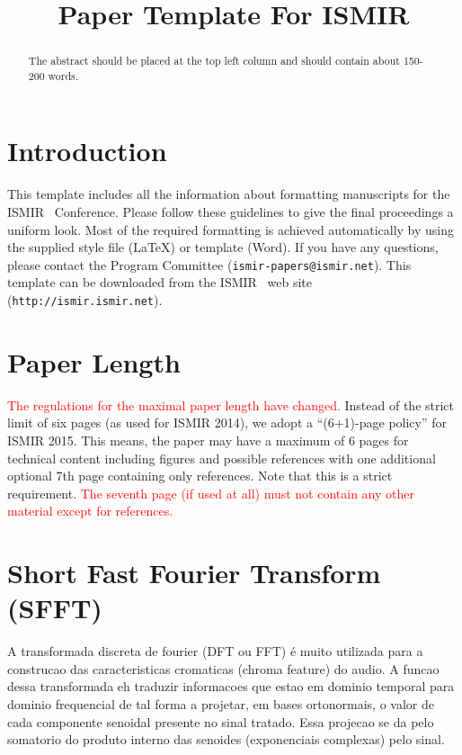 \documentclass{article}
\title{Paper Template For ISMIR \conferenceyear}
\begin{document}
%
\maketitle
%
\begin{abstract}
The abstract should be placed at the top left column and should contain about 150-200 words.
\end{abstract}
%
\section{Introduction}\label{sec:introduction}

	This template includes all the information about formatting manuscripts for the ISMIR \conferenceyear\ Conference.
	Please follow these guidelines to give the final proceedings a uniform look.
	Most of the required formatting is achieved automatically by using the supplied
	style file (\LaTeX) or template (Word).
	If you have any questions, please contact the Program Committee
	(\texttt{ismir\conferenceyear-papers@ismir.net}).
	This template can be downloaded from the ISMIR \conferenceyear\ web site (\texttt{http://ismir\conferenceyear.ismir.net}).
	\section{Paper Length}
	\textcolor{red}{The regulations for the maximal paper length have changed.}
	Instead of the strict limit of six pages (as used for ISMIR 2014), we adopt 
	a ``(6+1)-page policy'' for ISMIR 2015. This means, the paper may have a 
	maximum of 6 pages for technical content including figures and possible references 
	with one additional optional 7th page containing only references.
	Note that this is a strict requirement. 
	\textcolor{red}{The seventh page (if used at all) must
	not contain any other material except for references.}

\section{Short Fast Fourier Transform (SFFT)}\label{sec:sfft}

	A transformada discreta de fourier (DFT ou  FFT) é muito utilizada para a construcao das caracteristicas cromaticas (chroma feature) do audio. A funcao dessa transformada eh traduzir informacoes que estao em dominio temporal para dominio frequencial de tal forma a projetar, em bases ortonormais, o valor de cada componente senoidal presente no sinal tratado. Essa projecao se da pelo somatorio do produto interno das senoides (exponenciais complexas) pelo sinal.
\end{document}
